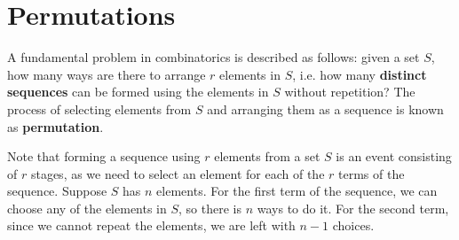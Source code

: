 \documentclass[math]{amznotes}
\theoremstyle{remark}
\begin{document}
\section{Permutations}
A fundamental problem in combinatorics is described as follows: given a set $S$, how many ways are there to arrange $r$ elements in $S$, i.e. how many \textbf{distinct sequences} can be formed using the elements in $S$ without repetition? The process of selecting elements from $S$ and arranging them as a sequence is known as \textbf{permutation}.

Note that forming a sequence using $r$ elements from a set $S$ is an event consisting of $r$ stages, as we need to select an element for each of the $r$ terms of the sequence. Suppose $S$ has $n$ elements. For the first term of the sequence, we can choose any of the elements in $S$, so there is $n$ ways to do it. For the second term, since we cannot repeat the elements, we are left with $n - 1$ choices. 
\end{document}
